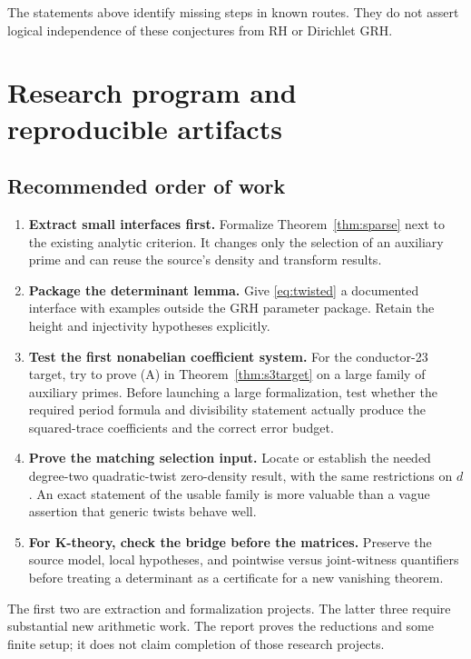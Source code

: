 \documentclass[11pt,letterpaper]{article}
\theoremstyle{definition}
\theoremstyle{remark}
\begin{document}
The statements above identify missing steps in known routes.
They do not assert logical independence of these conjectures
from RH or Dirichlet GRH.

\section{Research program and reproducible artifacts}
\label{sec:artifacts}

\subsection{Recommended order of work}

\begin{enumerate}
\item \textbf{Extract small interfaces first.} Formalize
Theorem~\ref{thm:sparse} next to the existing analytic criterion.
It changes only the selection of an auxiliary prime and can
reuse the source's density and transform results.
\item \textbf{Package the determinant lemma.} Give
\eqref{eq:twisted} a documented interface with examples outside
the GRH parameter package. Retain the height and injectivity
hypotheses explicitly.
\item \textbf{Test the first nonabelian coefficient system.}
For the conductor-23 target, try to prove (A) in
Theorem~\ref{thm:s3target} on a large family of auxiliary primes.
Before launching a large formalization, test whether the required
period formula and divisibility statement actually produce
the squared-trace coefficients and the correct error budget.
\item \textbf{Prove the matching selection input.}
Locate or establish the needed degree-two quadratic-twist
zero-density result, with the same restrictions on \(d\).
An exact statement of the usable family is more valuable than
a vague assertion that generic twists behave well.
\item \textbf{For K-theory, check the bridge before the matrices.}
Preserve the source model, local hypotheses, and pointwise versus
joint-witness quantifiers before treating a determinant as a
certificate for a new vanishing theorem.
\end{enumerate}

The first two are extraction and formalization projects.
The latter three require substantial new arithmetic work.
The report proves the reductions and some finite setup; it
does not claim completion of those research projects.
\end{document}
